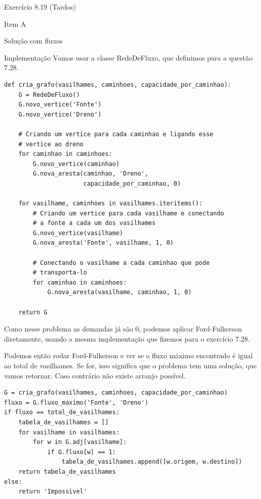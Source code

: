 \documentclass[presentation]{beamer}
\begin{document}
\begin{frame}[fragile,label=sec-6]{Exercício 8.19 (Tardos)}
\begin{block}{Item A}
\begin{block}{Solução com fluxos}
\begin{block}{Implementação}
Vamos usar a classe RedeDeFluxo, que definimos para a questão 7.28.

\begin{verbatim}
def cria_grafo(vasilhames, caminhoes, capacidade_por_caminhao):
    G = RedeDeFluxo()
    G.novo_vertice('Fonte')
    G.novo_vertice('Dreno')

    # Criando um vertice para cada caminhao e ligando esse
    # vertice ao dreno
    for caminhao in caminhoes:
        G.novo_vertice(caminhao)
        G.nova_aresta(caminhao, 'Dreno',
                      capacidade_por_caminhao, 0)

    for vasilhame, caminhoes in vasilhames.iteritems():
        # Criando um vertice para cada vasilhame e conectando
        # a fonte a cada um dos vasilhames
        G.novo_vertice(vasilhame)
        G.nova_aresta('Fonte', vasilhame, 1, 0)

        # Conectando o vasilhame a cada caminhao que pode
        # transporta-lo
        for caminhao in caminhoes:
            G.nova_aresta(vasilhame, caminhao, 1, 0)

    return G
\end{verbatim}

Como nesse problema as demandas já são 0, podemos aplicar
Ford-Fulkerson diretamente, usando a mesma implementação que fizemos
para o exercício 7.28.

Podemos então rodar Ford-Fulkerson e ver se o fluxo máximo encontrado
é igual ao total de vasilhames. Se for, isso significa que o problema
tem uma solução, que vamos retornar. Caso contrário não existe arranjo
possível.
\begin{verbatim}
G = cria_grafo(vasilhames, caminhoes, capacidade_por_caminhao)
fluxo = G.fluxo_maximo('Fonte', 'Dreno')
if fluxo == total_de_vasilhames:
    tabela_de_vasilhames = []
    for vasilhame in vasilhames:
        for w in G.adj[vasilhame]:
            if G.fluxo[w] == 1:
                tabela_de_vasilhames.append([w.origem, w.destino])
    return tabela_de_vasilhames
else:
    return 'Impossivel'
\end{verbatim}


\end{block}
\end{block}
\end{block}
\end{frame}
\end{document}
